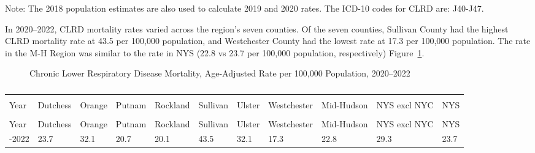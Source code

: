 \documentclass[
  english,
  letterpaper,
]{report}
\begin{document}
\begin{tcolorbox}[enhanced jigsaw, breakable, leftrule=.75mm, title=\textcolor{quarto-callout-note-color}{\faInfo}\hspace{0.5em}{Note}, bottomrule=.15mm, opacityback=0, left=2mm, colback=white, bottomtitle=1mm, coltitle=black, colbacktitle=quarto-callout-note-color!10!white, colframe=quarto-callout-note-color-frame, opacitybacktitle=0.6, toptitle=1mm, titlerule=0mm, arc=.35mm, rightrule=.15mm, toprule=.15mm]

Note: The 2018 population estimates are also used to calculate 2019 and
2020 rates. The ICD-10 codes for CLRD are: J40-J47.

\end{tcolorbox}

In 2020--2022, CLRD mortality rates varied across the region's seven
counties. Of the seven counties, Sullivan County had the highest CLRD
mortality rate at 43.5 per 100,000 population, and Westchester County
had the lowest rate at 17.3 per 100,000 population. The rate in the M-H
Region was similar to the rate in NYS (22.8 vs 23.7 per 100,000
population, respectively) Figure~\ref{fig-clrd-mortal-aar}.

\begin{figure}


\caption{\label{fig-clrd-mortal-aar}Chronic Lower Respiratory Disease
Mortality, Age-Adjusted Rate per 100,000 Population, 2020--2022}

\end{figure}%

\begin{longtable}[]{@{}lllllllllll@{}}

\caption{\label{tbl-clrd-mortal-aar}Chronic Lower Respiratory Disease
Mortality, Age-Adjusted Rate per 100,000 Population, 2020--2022}

\tabularnewline

\caption{}\label{T_4339f}\tabularnewline
\toprule\noalign{}
\multicolumn{11}{@{}l@{}}{%
} \\
Year & Dutchess & Orange & Putnam & Rockland & Sullivan & Ulster &
Westchester & Mid-Hudson & NYS excl NYC & NYS \\
\midrule\noalign{}
\endfirsthead
\toprule\noalign{}
\multicolumn{11}{@{}l@{}}{%
} \\
Year & Dutchess & Orange & Putnam & Rockland & Sullivan & Ulster &
Westchester & Mid-Hudson & NYS excl NYC & NYS \\
\midrule\noalign{}
\endhead
\bottomrule\noalign{}
\endlastfoot
2020-2022 & 23.7 & 32.1 & 20.7 & 20.1 & 43.5 & 32.1 & 17.3 & 22.8 & 29.3
& 23.7 \\

\end{longtable}
\end{document}
